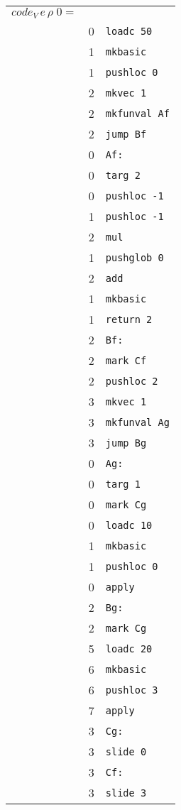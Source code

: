 \documentclass[10pt,a4paper]{article}
\begin{document}
	\begin{tabular}{l l l}
		$code_V \, e \, \rho \; 0 = $ &  &\\
		& 0 & \texttt{loadc 50} \\
		& 1 & \texttt{mkbasic} \\
		& 1 & \texttt{pushloc 0} \\
		& 2 & \texttt{mkvec 1} \\
		& 2 & \texttt{mkfunval Af} \\
		& 2 & \texttt{jump Bf} \\
		
		& 0 & \texttt{Af:} \\
		& 0 & \texttt{targ 2} \\
		& 0 & \texttt{pushloc -1} \\
		& 1 & \texttt{pushloc -1} \\
		& 2 & \texttt{mul} \\
		& 1 & \texttt{pushglob 0} \\
		& 2 & \texttt{add} \\
		& 1 & \texttt{mkbasic} \\
		& 1 & \texttt{return 2} \\
		
		& 2 & \texttt{Bf:} \\
		& 2 & \texttt{mark Cf} \\
		& 2 & \texttt{pushloc 2} \\
		& 3 & \texttt{mkvec 1} \\
		& 3 & \texttt{mkfunval Ag} \\
		& 3 & \texttt{jump Bg} \\
		
		& 0 & \texttt{Ag:} \\
		& 0 & \texttt{targ 1} \\
		& 0 & \texttt{mark Cg} \\
		& 0 & \texttt{loadc 10} \\
		& 1 & \texttt{mkbasic} \\
		& 1 & \texttt{pushloc 0} \\
		& 0 & \texttt{apply} \\
		
		& 2 & \texttt{Bg:} \\
		& 2 & \texttt{mark Cg} \\
		& 5 & \texttt{loadc 20} \\
		& 6 & \texttt{mkbasic} \\
		& 6 & \texttt{pushloc 3} \\
		& 7 & \texttt{apply} \\
		
		& 3 & \texttt{Cg:} \\
		& 3 & \texttt{slide 0} \\
		
		& 3 & \texttt{Cf:} \\
		& 3 & \texttt{slide 3} \\
	\end{tabular}
	
\end{document}
